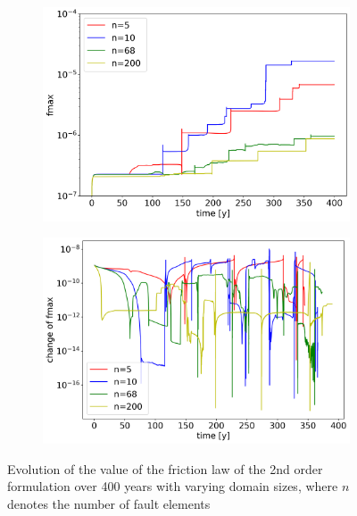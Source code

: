 \begin{figure}[H]
	\centering
	\begin{subfigure}{0.45\textwidth}
		\centering
		\includegraphics[width=1\textwidth]{images/TANDEMtimeEvolutionFExtendedODEDifferentSizes.png}
		\label{fig:timeEvolution_2ndOrderODE_differentSizes}
	\end{subfigure}
	\begin{subfigure}{0.45\textwidth}
		\centering
		\includegraphics[width=1\textwidth]{images/TANDEMtimeEvolutionFLTEExtendedODEDifferentSizes.png}
		\label{fig:timeEvolution_LTE_2ndOrderODE_differentSizes}
	\end{subfigure}
	\caption{Evolution of the value of the friction law of the 2nd order formulation over 400 years with varying domain sizes, where $n$ denotes the number of fault elements}
\end{figure}

